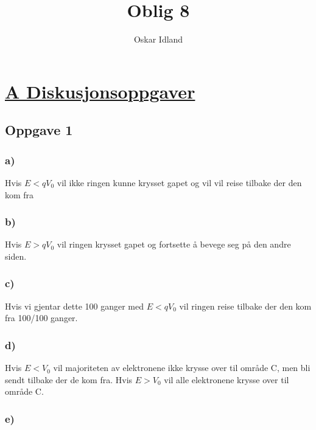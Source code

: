 \documentclass{article}
\author{Oskar Idland}
\title{Oblig 8}
\date{}
\begin{document}
\maketitle
\newpage
\section*{\underline{A Diskusjonsoppgaver}}
\subsection*{Oppgave 1}
\subsubsection*{a)}
Hvis $E < qV_0$ vil ikke ringen kunne krysset gapet og vil vil reise tilbake der den kom fra

\subsubsection*{b)}
Hvis $E > qV_0$ vil ringen krysset gapet og fortsette å bevege seg på den andre siden. 

\subsubsection*{c)}
Hvis vi gjentar dette 100 ganger med $E < qV_0 $ vil ringen reise tilbake der den kom fra 100/100 ganger. 

\subsubsection*{d)}
Hvis $E < V_0$ vil majoriteten av elektronene ikke krysse over til område C, men bli sendt tilbake der de kom fra. 
Hvis $E > V_0$ vil alle elektronene krysse over til område C.

\subsubsection*{e)}
\end{document}
